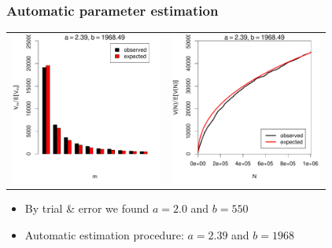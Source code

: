 \documentclass[t]{beamer} %
\begin{document}
\begin{frame}
  \frametitle{Automatic parameter estimation}

  \begin{center}
    \begin{tabular}{c @{} c}
      \includegraphics[width=50mm]{img/05-estimation-spc-estimated} &
      \includegraphics[width=50mm]{img/05-estimation-vgc-estimated} 
    \end{tabular}
  \end{center}

  \ungap[1]
  \begin{itemize}
    \item By trial \& error we found $a=2.0$ and $b=550$
    \item Automatic estimation procedure: $a=2.39$ and $b=1968$
  \end{itemize}
\end{frame}
\end{document}
